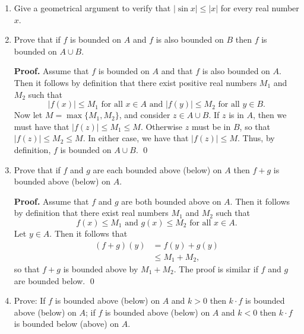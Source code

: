 \begin{enumerate}
   \item Give a geometrical argument to verify that $|\sin x| \le |x|$ for every
         real number $x$.
   \item Prove that if $f$ is bounded on $A$ and $f$ is also bounded on $B$ then
         $f$ is bounded on $A \cup B$.

      \textbf{Proof.} Assume that $f$ is bounded on $A$ and that $f$ is also
      bounded on $A$. Then it follows by definition that there exist positive
      real numbers $M_1$ and $M_2$ such that
      $$|f(x)| \le M_1 \text{ for all } x \in A \text{ and }
        |f(y)| \le M_2 \text{ for all } y \in B.$$
      Now let $M = \max\{M_1, M_2\}$, and consider $z \in A \cup B$. If $z$ is
      in $A$, then we must have that $|f(z)| \le M_1 \le M$. Otherwise $z$ must 
      be in $B$, so that $|f(z)| \le M_2 \le M$. In either case, we have that
      $|f(z)| \le M$. Thus, by definition, $f$ is bounded on $A \cup B$. \qed
   \item Prove that if $f$ and $g$ are each bounded above (below) on $A$ then
         $f + g$ is bounded above (below) on $A$.

      \textbf{Proof.} Assume that $f$ and $g$ are both bounded above on $A$.
      Then it follows by definition that there exist real numbers $M_1$ and
      $M_2$ such that
      $$f(x) \le M_1 \text{ and } g(x) \le M_2 \text{ for all } x \in A.$$
      Let $y \in A$. Then it follows that
      \begin{align*}
         (f + g)(y) &= f(y) + g(y) \\
                    &\le M_1 + M_2,
      \end{align*}
      so that $f + g$ is bounded above by $M_1 + M_2$. The proof is similar if
      $f$ and $g$ are bounded below. \qed
   \item Prove: If $f$ is bounded above (below) on $A$ and $k > 0$ then
         $k \cdot f$ is bounded above (below) on $A$; if $f$ is bounded above
         (below) on $A$ and $k < 0$ then $k \cdot f$ is bounded below (above) on
         $A$.


\end{enumerate}
